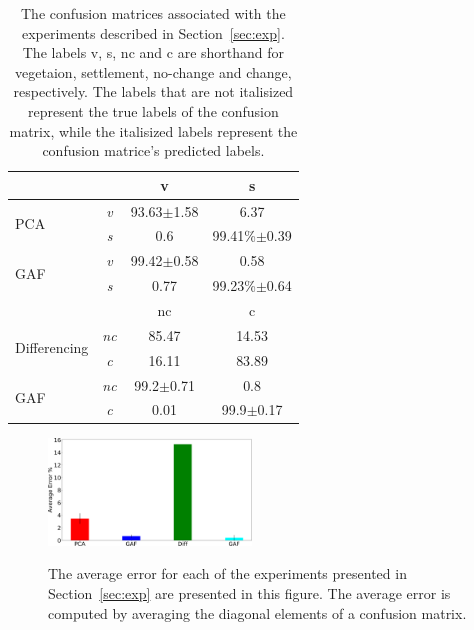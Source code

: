 \documentclass{article}
\begin{document}
\label{sec:results}
\begin{table}
\begin{tabular}{ |l|c c c| }
\hline
& & v & s\\
\hline
\multirow{2}{*}{PCA} & \emph{v} & 93.63$\pm$1.58&6.37\\
& \emph{s}& 0.6& 99.41\%$\pm$0.39\\
\hline
\multirow{2}{*}{GAF} & \emph{v} & 99.42$\pm$0.58&0.58\\
& \emph{s}& 0.77& 99.23\%$\pm$0.64\\
\hline
\hline
& & nc & c\\
\hline
\multirow{2}{*}{Differencing} & \emph{nc} & 85.47 & 14.53\\
& \emph{c}& 16.11 & 83.89\\
\multirow{2}{*}{GAF} & \emph{nc} & 99.2$\pm$0.71 & 0.8\\
& \emph{c}& 0.01 & 99.9$\pm$0.17\\
\hline
\end{tabular}
\caption{The confusion matrices associated with the experiments described in Section~\ref{sec:exp}. The labels v, s, nc and c are shorthand for vegetaion, settlement, no-change and change, respectively. The labels that are not italisized represent the true labels of the confusion matrix, while the italisized labels represent the confusion matrice's predicted labels.}
\label{tab:cm}
\end{table}

\begin{figure}
 \includegraphics[width=0.48\textwidth]{results-crop.pdf}
 \label{fig:results}
 \caption{The average error for each of the experiments presented in Section~\ref{sec:exp} are presented in this figure. The average error is computed by averaging the diagonal elements of a confusion matrix.}
\end{figure}
\end{document}
